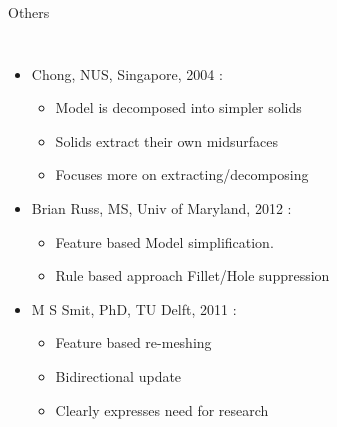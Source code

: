 \begin{frame}[<+-| alert@+>]{Others}

\begin{columns}[T]


	\begin{itemize}[noitemsep,label=\textbullet,topsep=2pt,parsep=2pt,partopsep=2pt]
	\item Chong, NUS, Singapore, 2004 \cite{Chong2004}:

		\begin{itemize}[noitemsep,label=\textbullet,topsep=2pt,parsep=2pt,partopsep=2pt]
		\item Model is decomposed into simpler solids
		\item Solids extract their own midsurfaces
		\item Focuses more on extracting/decomposing  
		\end{itemize}

	\item Brian Russ, MS, Univ of Maryland, 2012 \cite{Russ2012}: 
		\begin{itemize}[noitemsep,label=\textbullet,topsep=2pt,parsep=2pt,partopsep=2pt]
		\item Feature based Model simplification.
		\item Rule based approach Fillet/Hole suppression
		\end{itemize}

	\item M S Smit, PhD, TU Delft, 2011 \cite{Smit2011}:
		\begin{itemize}[noitemsep,label=\textbullet,topsep=2pt,parsep=2pt,partopsep=2pt]
		\item Feature based re-meshing
		\item Bidirectional update
		\item Clearly expresses need for research
		\end{itemize}
	\end{itemize}


\end{columns}
\end{frame}

